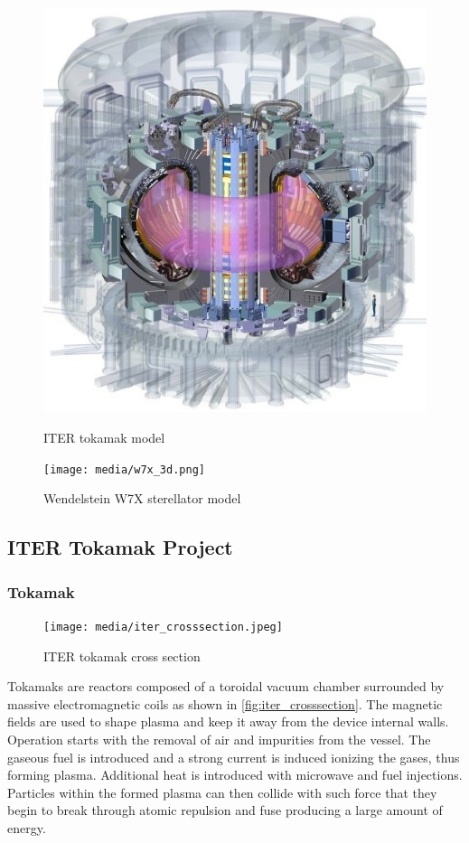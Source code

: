   \begin{figure}[H]
    \centering
    \begin{minipage}{.5\textwidth}
      \centering
      \includegraphics[width=.5\linewidth]{media/iter_reactor_3d.jpeg}
      \caption{ITER tokamak model\cite{iter_website}}
      \label{fig:iter_reactor}
    \end{minipage}%
    \begin{minipage}{.5\textwidth}
      \centering
	  \texttt{[image: media/w7x\_3d.png]}
      \caption{Wendelstein W7X sterellator model\cite{w7x_website}}
      \label{fig:w7x_reactor}
    \end{minipage}
  \end{figure}

\subsection{ITER Tokamak Project}
  \subsubsection{Tokamak}
	\begin{figure}[H]
	  \centering
	  \texttt{[image: media/iter\_crosssection.jpeg]}
	  \caption{ITER tokamak cross section\cite{iter_website}}
	  \label{fig:iter_crosssection}
	\end{figure}
	Tokamaks are reactors composed of a toroidal vacuum chamber surrounded by
	massive electromagnetic coils as shown in \autoref{fig:iter_crosssection}.
	The magnetic fields are used to shape plasma 
	and keep it away from the device internal walls. 
	Operation starts with the removal of air and impurities from the vessel.
	The gaseous fuel is introduced and a strong current is induced 
	ionizing the gases, thus forming plasma. Additional heat is introduced with
	microwave and fuel injections. Particles within the
	formed plasma can then collide with such force that they begin
	to break through atomic repulsion and fuse producing a large amount of energy.
	\cite{iter_website}
